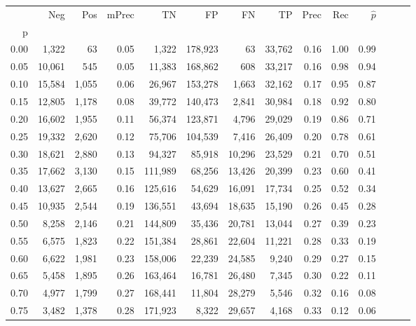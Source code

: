 \begin{tabular}{rrrrrrrrrrrrrr}
\toprule
{} &     Neg &    Pos & mPrec &       TN &       FP &      FN &      TP &  Prec &   Rec & $\hat{p}$ \\
p    &         &        &       &          &          &         &         &       &       &           \\
\midrule
0.00 &   1,322 &     63 &  0.05 &    1,322 &  178,923 &      63 &  33,762 &  0.16 &  1.00 &      0.99 \\
0.05 &  10,061 &    545 &  0.05 &   11,383 &  168,862 &     608 &  33,217 &  0.16 &  0.98 &      0.94 \\
0.10 &  15,584 &  1,055 &  0.06 &   26,967 &  153,278 &   1,663 &  32,162 &  0.17 &  0.95 &      0.87 \\
0.15 &  12,805 &  1,178 &  0.08 &   39,772 &  140,473 &   2,841 &  30,984 &  0.18 &  0.92 &      0.80 \\
0.20 &  16,602 &  1,955 &  0.11 &   56,374 &  123,871 &   4,796 &  29,029 &  0.19 &  0.86 &      0.71 \\
0.25 &  19,332 &  2,620 &  0.12 &   75,706 &  104,539 &   7,416 &  26,409 &  0.20 &  0.78 &      0.61 \\
0.30 &  18,621 &  2,880 &  0.13 &   94,327 &   85,918 &  10,296 &  23,529 &  0.21 &  0.70 &      0.51 \\
0.35 &  17,662 &  3,130 &  0.15 &  111,989 &   68,256 &  13,426 &  20,399 &  0.23 &  0.60 &      0.41 \\
0.40 &  13,627 &  2,665 &  0.16 &  125,616 &   54,629 &  16,091 &  17,734 &  0.25 &  0.52 &      0.34 \\
0.45 &  10,935 &  2,544 &  0.19 &  136,551 &   43,694 &  18,635 &  15,190 &  0.26 &  0.45 &      0.28 \\
0.50 &   8,258 &  2,146 &  0.21 &  144,809 &   35,436 &  20,781 &  13,044 &  0.27 &  0.39 &      0.23 \\
0.55 &   6,575 &  1,823 &  0.22 &  151,384 &   28,861 &  22,604 &  11,221 &  0.28 &  0.33 &      0.19 \\
0.60 &   6,622 &  1,981 &  0.23 &  158,006 &   22,239 &  24,585 &   9,240 &  0.29 &  0.27 &      0.15 \\
0.65 &   5,458 &  1,895 &  0.26 &  163,464 &   16,781 &  26,480 &   7,345 &  0.30 &  0.22 &      0.11 \\
0.70 &   4,977 &  1,799 &  0.27 &  168,441 &   11,804 &  28,279 &   5,546 &  0.32 &  0.16 &      0.08 \\
0.75 &   3,482 &  1,378 &  0.28 &  171,923 &    8,322 &  29,657 &   4,168 &  0.33 &  0.12 &      0.06 \\

\end{tabular}
